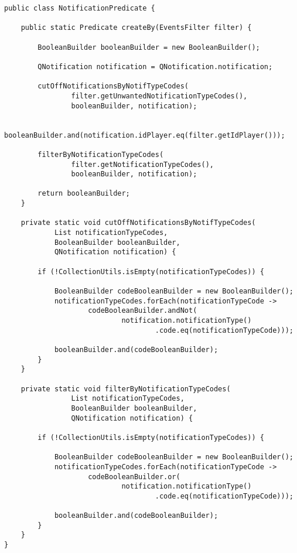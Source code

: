 \documentclass[twoside, 12pt]{article}
\begin{document}
{\vspace{20}

\begin{lstlisting}
public class NotificationPredicate {

    public static Predicate createBy(EventsFilter filter) {

        BooleanBuilder booleanBuilder = new BooleanBuilder();

        QNotification notification = QNotification.notification;

        cutOffNotificationsByNotifTypeCodes(
                filter.getUnwantedNotificationTypeCodes(),
                booleanBuilder, notification);

        booleanBuilder.and(notification.idPlayer.eq(filter.getIdPlayer()));

        filterByNotificationTypeCodes(
                filter.getNotificationTypeCodes(),
                booleanBuilder, notification);

        return booleanBuilder;
    }

    private static void cutOffNotificationsByNotifTypeCodes(
            List notificationTypeCodes,
            BooleanBuilder booleanBuilder,
            QNotification notification) {

        if (!CollectionUtils.isEmpty(notificationTypeCodes)) {

            BooleanBuilder codeBooleanBuilder = new BooleanBuilder();
            notificationTypeCodes.forEach(notificationTypeCode ->
                    codeBooleanBuilder.andNot(
                            notification.notificationType()
                                    .code.eq(notificationTypeCode)));

            booleanBuilder.and(codeBooleanBuilder);
        }
    }

    private static void filterByNotificationTypeCodes(
                List notificationTypeCodes,
                BooleanBuilder booleanBuilder,
                QNotification notification) {

        if (!CollectionUtils.isEmpty(notificationTypeCodes)) {

            BooleanBuilder codeBooleanBuilder = new BooleanBuilder();
            notificationTypeCodes.forEach(notificationTypeCode ->
                    codeBooleanBuilder.or(
                            notification.notificationType()
                                    .code.eq(notificationTypeCode)));

            booleanBuilder.and(codeBooleanBuilder);
        }
    }
}
\end{lstlisting}

}
\end{document}
